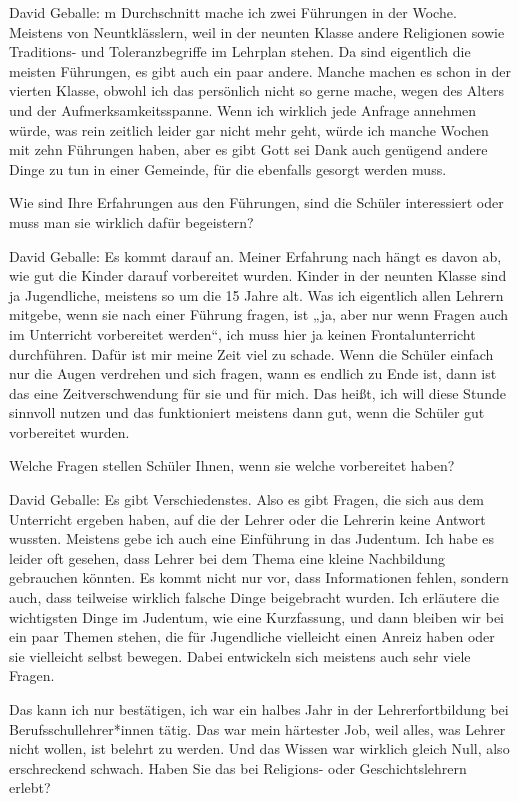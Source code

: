 David Geballe: m Durchschnitt mache ich zwei Führungen in der Woche. Meistens von Neuntklässlern, weil in der neunten Klasse andere Religionen sowie Traditions- und Toleranzbegriffe im Lehrplan stehen. Da sind eigentlich die meisten Führungen, es gibt auch ein paar andere. Manche machen es schon in der vierten Klasse, obwohl ich das persönlich nicht so gerne mache, wegen des Alters und der Aufmerksamkeitsspanne. Wenn ich wirklich jede Anfrage annehmen würde, was rein zeitlich leider gar nicht mehr geht, würde ich manche Wochen mit zehn Führungen haben, aber es gibt Gott sei Dank auch genügend andere Dinge zu tun in einer Gemeinde, für die ebenfalls gesorgt werden muss. 

Wie sind Ihre Erfahrungen aus den Führungen, sind die Schüler interessiert oder muss man sie wirklich dafür begeistern? 

David Geballe: Es kommt darauf an. Meiner Erfahrung nach hängt es davon ab, wie gut die Kinder darauf vorbereitet wurden. Kinder in der neunten Klasse sind ja Jugendliche, meistens so um die 15 Jahre alt. Was ich eigentlich allen Lehrern mitgebe, wenn sie nach einer Führung fragen, ist „ja, aber nur wenn Fragen auch im Unterricht vorbereitet werden“, ich muss hier ja keinen Frontalunterricht durchführen. Dafür ist mir meine Zeit viel zu schade. Wenn die Schüler einfach nur die Augen verdrehen und sich fragen, wann es endlich zu Ende ist, dann ist das eine Zeitverschwendung für sie und für mich. Das heißt, ich will diese Stunde sinnvoll nutzen und das funktioniert meistens dann gut, wenn die Schüler gut vorbereitet wurden. 

Welche Fragen stellen Schüler Ihnen, wenn sie welche vorbereitet haben? 

David Geballe: Es gibt Verschiedenstes. Also es gibt Fragen, die sich aus dem Unterricht ergeben haben, auf die der Lehrer oder die Lehrerin keine Antwort wussten. Meistens gebe ich auch eine Einführung in das Judentum. Ich habe es leider oft gesehen, dass Lehrer bei dem Thema eine kleine Nachbildung gebrauchen könnten. Es kommt nicht nur vor, dass Informationen fehlen, sondern auch, dass teilweise wirklich falsche Dinge beigebracht wurden. Ich erläutere die wichtigsten Dinge im Judentum, wie eine Kurzfassung, und dann bleiben wir bei ein paar Themen stehen, die für Jugendliche vielleicht einen Anreiz haben oder sie vielleicht selbst bewegen. Dabei entwickeln sich meistens auch sehr viele Fragen. 

Das kann ich nur bestätigen, ich war ein halbes Jahr in der Lehrerfortbildung bei Berufsschullehrer*innen tätig. Das war mein härtester Job, weil alles, was Lehrer nicht wollen, ist belehrt zu werden. Und das Wissen war wirklich gleich Null, also erschreckend schwach. Haben Sie das bei Religions- oder Geschichtslehrern erlebt? 

